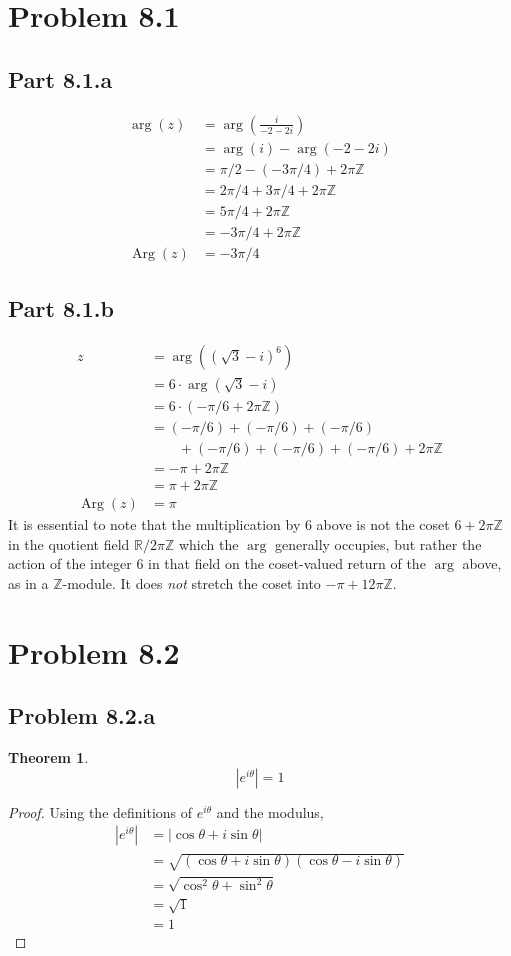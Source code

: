 \documentclass{article}
\newtheorem{theorem}[subsection]{Theorem}
\theoremstyle{definition}
\newcommand{\R}{\mathbb{R}}
\newcommand{\Z}{\mathbb{Z}}
\newcommand{\p}[1]{\left(#1\right)}
\begin{document}
\section{Problem 8.1}
\subsection{Part 8.1.a}
\begin{align*}
\arg(z)
&= \arg\p{\frac{i}{-2-2i}} \\
&= \arg(i) - \arg(-2-2i) \\
&= \pi/2 - (-3\pi/4) + 2\pi\Z \\
&= 2\pi/4 + 3\pi/4 + 2\pi\Z \\
&= 5\pi/4 + 2\pi\Z \\
&= -3\pi/4 + 2\pi\Z \\
\operatorname{Arg}(z) &= -3\pi/4
\end{align*}

\subsection{Part 8.1.b}
\begin{align*}
z
&= \arg\p{ \p{\sqrt{3}-i}^6 } \\
&= 6 \cdot \arg\p{\sqrt{3}-i} \\
&= 6 \cdot (-\pi/6 + 2\pi\Z)  \\
&= (-\pi/6)+(-\pi/6)+(-\pi/6) \\
&\qquad+(-\pi/6)+(-\pi/6)+(-\pi/6)+2\pi\Z \\
&= -\pi + 2\pi\Z \\
&= \pi + 2\pi\Z \\
\operatorname{Arg}(z) &= \pi 
\end{align*}
It is essential to note that the multiplication by 6 above is not the coset $6+2\pi\Z$ in the 
quotient field $\R/2\pi\Z$ which the $\arg$ generally occupies, but rather the action of 
the integer $6$ 
in that field on the coset-valued return of the $\arg$ above, as in a $\Z$-module. It does 
\textit{not} stretch the coset into $-\pi+12\pi\Z$.

\section{Problem 8.2}
\subsection{Problem 8.2.a}
\begin{theorem}
\[|e^{i\theta}|=1\]
\end{theorem}
\begin{proof}
Using the definitions of $e^{i\theta}$ and the modulus,
\begin{align*}
|e^{i\theta}| 
&= \left| \cos\theta+i\sin\theta \right| \\
&= \sqrt{(\cos\theta+i\sin\theta)(\cos\theta-i\sin\theta)}\\
&= \sqrt{ \cos^2\theta + \sin^2\theta }\\
&= \sqrt{1}\\
&= 1
\end{align*}
\end{proof}
\end{document}
